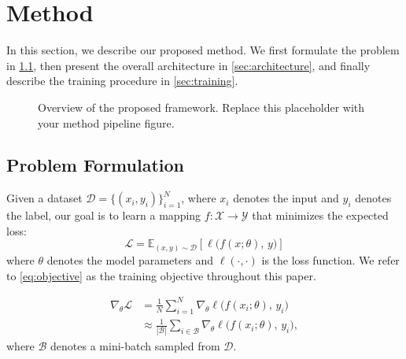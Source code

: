 \section{Method}
\label{sec:method}

In this section, we describe our proposed method. We first formulate the problem in \cref{sec:formulation}, then present the overall architecture in \cref{sec:architecture}, and finally describe the training procedure in \cref{sec:training}.

\begin{figure}[t]
  \centering
  \fbox{\rule{0pt}{2in}\rule{0.9\linewidth}{0pt}}  %
  \caption{Overview of the proposed \method framework. Replace this placeholder with your method pipeline figure.}
  \label{fig:method_overview}
\end{figure}

\subsection{Problem Formulation}
\label{sec:formulation}

Given a dataset $\mathcal{D} = \{(x_i, y_i)\}_{i=1}^{N}$, where $x_i$ denotes the input and $y_i$ denotes the label, our goal is to learn a mapping $f: \mathcal{X} \rightarrow \mathcal{Y}$ that minimizes the expected loss:
\begin{equation}
  \mathcal{L} = \mathbb{E}_{(x,y) \sim \mathcal{D}} \left[ \ell\bigl(f(x; \theta),\, y\bigr) \right]
  \label{eq:objective}
\end{equation}
where $\theta$ denotes the model parameters and $\ell(\cdot, \cdot)$ is the loss function. We refer to \cref{eq:objective} as the training objective throughout this paper.

\begin{equation}
  \begin{aligned}
    \nabla_\theta \mathcal{L}
    &= \frac{1}{N} \sum_{i=1}^{N} \nabla_\theta \ell\bigl(f(x_i; \theta),\, y_i\bigr) \\
    &\approx \frac{1}{|\mathcal{B}|} \sum_{i \in \mathcal{B}} \nabla_\theta \ell\bigl(f(x_i; \theta),\, y_i\bigr),
  \end{aligned}
  \label{eq:gradient}
\end{equation}
where $\mathcal{B}$ denotes a mini-batch sampled from $\mathcal{D}$.

